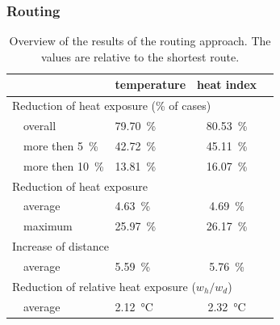 \subsubsection{Routing}

\begin{table}
	\centering
	\begin{tabular}{lp{9.25cm}lcc}
		\hline
		& & temperature & heat index \\
		\hline
		\multicolumn{4}{l}{Reduction of heat exposure (\% of cases) }   \\
		& overall  & \SI{79.70}{\percent} & \SI{80.53}{\percent}  \\
		& more then \SI{5}{\percent} & \SI{42.72}{\percent} & \SI{45.11}{\percent} \\
		& more then \SI{10}{\percent} & \SI{13.81}{\percent} & \SI{16.07}{\percent} \\
		\multicolumn{4}{l}{Reduction of heat exposure}  \\
		& average  & \SI{4.63}{\percent} & \SI{4.69}{\percent}  \\
		& maximum  & \SI{25.97}{\percent} & \SI{26.17 }{\percent}  \\
		\multicolumn{4}{l}{Increase of distance}  \\
		& average & \SI{5.59}{\percent} & \SI{5.76}{\percent}  \\
		\multicolumn{4}{l}{Reduction of relative heat exposure ($w_h / w_d$)}  \\
		& average  & \SI{2.12}{\celsius} & \SI{2.32}{\celsius}  \\
		\hline
	\end{tabular}
	\caption{Overview of the results of the routing approach. The values are relative to the shortest route. \label{tab:results-routing}}
\end{table}


